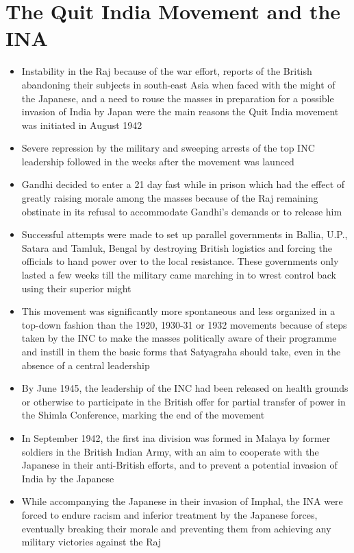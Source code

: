 \section{The Quit India Movement and the INA}
\begin{itemize}
    \item Instability in the Raj because of the war effort, reports of the British abandoning their subjects in south-east Asia when faced with the might of the Japanese, and a need to rouse the masses in preparation for a possible invasion of India by Japan were the main reasons the Quit India movement was initiated in August 1942
    \item Severe repression by the military and sweeping arrests of the top INC leadership followed in the weeks after the movement was launced
    \item Gandhi decided to enter a 21 day fast while in prison which had the effect of greatly raising morale among the masses because of the Raj remaining obstinate in its refusal to accommodate Gandhi's demands or to release him
    \item Successful attempts were made to set up parallel governments in Ballia, U.P., Satara and Tamluk, Bengal by destroying British logistics and forcing the officials to hand power over to the local resistance. These governments only lasted a few weeks till the military came marching in to wrest control back using their superior might
    \item This movement was significantly more spontaneous and less organized in a top-down fashion than the 1920, 1930-31 or 1932 movements because of steps taken by the INC to make the masses politically aware of their programme and instill in them the basic forms that Satyagraha should take, even in the absence of a central leadership
    \item By June 1945, the leadership of the INC had been released on health grounds or otherwise to participate in the British offer for partial transfer of power in the Shimla Conference, marking the end of the movement
    \item In September 1942, the first \gls{ina} division was formed in Malaya by former soldiers in the British Indian Army, with an aim to cooperate with the Japanese in their anti-British efforts, and to prevent a potential invasion of India by the Japanese
    \item While accompanying the Japanese in their invasion of Imphal, the INA were forced to endure racism and inferior treatment by the Japanese forces, eventually breaking their morale and preventing them from achieving any military victories against the Raj
\end{itemize}

